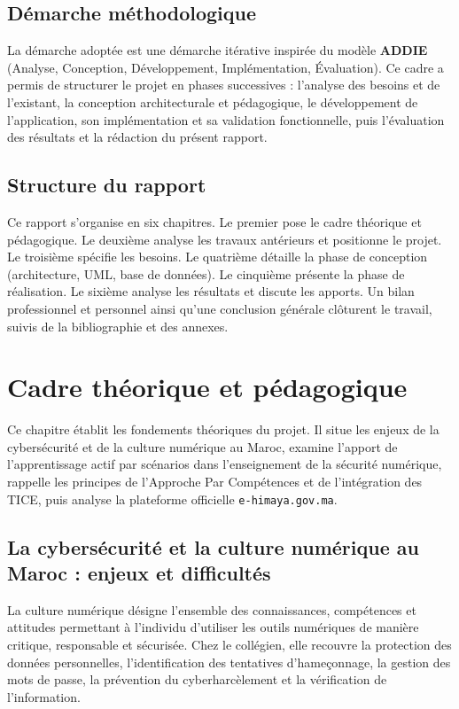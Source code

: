 \documentclass[12pt, a4paper, oneside]{report}
\begin{document}
\section*{Démarche méthodologique}
La démarche adoptée est une démarche itérative inspirée du modèle \textbf{ADDIE} (Analyse, Conception, Développement, Implémentation, Évaluation). Ce cadre a permis de structurer le projet en phases successives : l'analyse des besoins et de l'existant, la conception architecturale et pédagogique, le développement de l'application, son implémentation et sa validation fonctionnelle, puis l'évaluation des résultats et la rédaction du présent rapport.

\section*{Structure du rapport}
Ce rapport s'organise en six chapitres. Le premier pose le cadre théorique et pédagogique. Le deuxième analyse les travaux antérieurs et positionne le projet. Le troisième spécifie les besoins. Le quatrième détaille la phase de conception (architecture, UML, base de données). Le cinquième présente la phase de réalisation. Le sixième analyse les résultats et discute les apports. Un bilan professionnel et personnel ainsi qu'une conclusion générale clôturent le travail, suivis de la bibliographie et des annexes.

\chapter{Cadre théorique et pédagogique}

Ce chapitre établit les fondements théoriques du projet. Il situe les enjeux de la cybersécurité et de la culture numérique au Maroc, examine l'apport de l'apprentissage actif par scénarios dans l'enseignement de la sécurité numérique, rappelle les principes de l'Approche Par Compétences et de l'intégration des TICE, puis analyse la plateforme officielle \texttt{e-himaya.gov.ma}.

\section{La cybersécurité et la culture numérique au Maroc : enjeux et difficultés}
La culture numérique désigne l'ensemble des connaissances, compétences et attitudes permettant à l'individu d'utiliser les outils numériques de manière critique, responsable et sécurisée. Chez le collégien, elle recouvre la protection des données personnelles, l'identification des tentatives d'hameçonnage, la gestion des mots de passe, la prévention du cyberharcèlement et la vérification de l'information.
\end{document}

